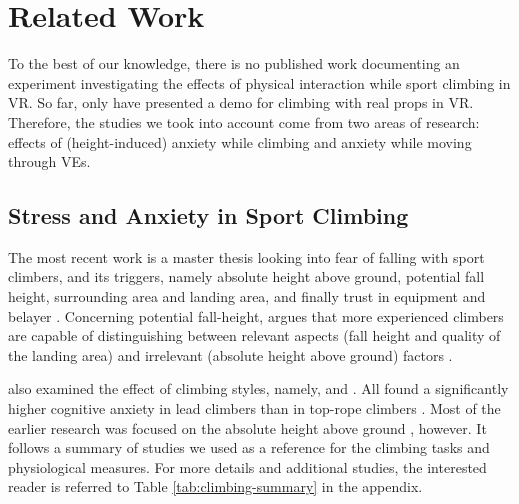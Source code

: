 \section{Related Work}
\label{sec:related-work}

To the best of our knowledge, there is no published work documenting an experiment investigating the effects of physical interaction while sport climbing in \gls{VR}. So far, only \textcite{Tiator2018} have presented a demo for climbing with real props in \gls{VR}. Therefore, the studies we took into account come from two areas of research: effects of (height-induced) anxiety while climbing and anxiety while moving through \glspl{VE}.

\subsection{Stress and Anxiety in Sport Climbing}
\label{sec:related-work-climbing}

The most recent work is a master thesis looking into fear of falling with sport climbers, and its triggers, namely absolute height above ground, potential fall height, surrounding area and landing area, and finally trust in equipment and belayer \autocites{Bertle2014}[based on][]{Sheel2004}. Concerning potential fall-height, \citeauthor{Bertle2014} argues that more experienced climbers are capable of distinguishing between relevant aspects (fall height and quality of the landing area) and irrelevant (absolute height above ground) factors \autocite{Fryer2013,Draper2012,Sherk2011}. 

\textcites{Bertle2014,Fryer2013,Hardy2007} also examined the effect of climbing styles, namely,  and . All found a significantly higher cognitive anxiety in \gls{lead} climbers than in \gls{top-rope} climbers \autocite{Bertle2014,Hardy2007}. Most of the earlier research was focused on the absolute height above ground \autocite{Kunzell2010, Oudejans2009, Pijpers2006, Pijpers2005, Pijpers2003}, however. It follows a summary of studies we used as a reference for the climbing tasks and physiological measures. For more details and additional studies, the interested reader is referred to Table \ref{tab:climbing-summary} in the appendix.


